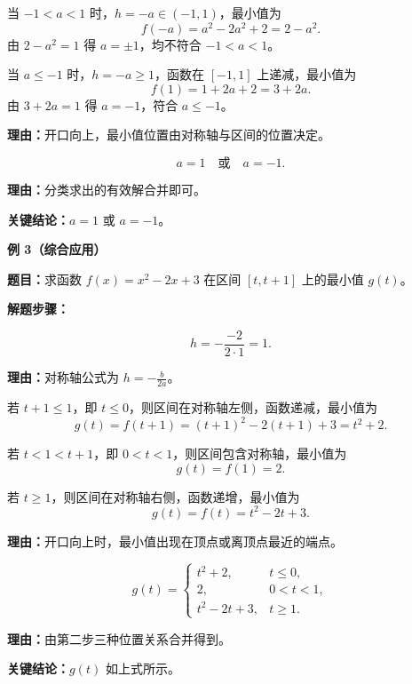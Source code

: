 \begin{examplebox}
\begin{description}[style=nextline, leftmargin=2.8em, labelsep=0.5em, itemsep=0.45em]
		      当 $-1<a<1$ 时，$h=-a\in(-1,1)$，最小值为
		      \[
			      f(-a)=a^2-2a^2+2=2-a^2.
		      \]
		      由 $2-a^2=1$ 得 $a=\pm1$，均不符合 $-1<a<1$。

		      当 $a\le-1$ 时，$h=-a\ge1$，函数在 $[-1,1]$ 上递减，最小值为
		      \[
			      f(1)=1+2a+2=3+2a.
		      \]
		      由 $3+2a=1$ 得 $a=-1$，符合 $a\le-1$。
		      \par\textbf{理由：}开口向上，最小值位置由对称轴与区间的位置决定。
		\item[\textbf{第三步（写出答案）：}]
		      \[
			      a=1\quad\text{或}\quad a=-1.
		      \]
		      \par\textbf{理由：}分类求出的有效解合并即可。
	\end{description}

	\textbf{\textcolor{CExample}{关键结论：}}$a=1$ 或 $a=-1$。

	\medskip
	\textbf{\textcolor{CExample}{例 3（综合应用）}}

	\textbf{\textcolor{CExample}{题目：}}求函数 $f(x)=x^2-2x+3$ 在区间 $[t,t+1]$ 上的最小值 $g(t)$。

	\textbf{\textcolor{CExample}{解题步骤：}}
	\begin{description}[style=nextline, leftmargin=2.8em, labelsep=0.5em, itemsep=0.45em]
		\item[\textbf{第一步（求对称轴）：}]
		      \[
			      h=-\frac{-2}{2\cdot1}=1.
		      \]
		      \par\textbf{理由：}对称轴公式为 $h=-\frac{b}{2a}$。
		\item[\textbf{第二步（分情况求最小值）：}]
		      若 $t+1\le1$，即 $t\le0$，则区间在对称轴左侧，函数递减，最小值为
		      \[
			      g(t)=f(t+1)=(t+1)^2-2(t+1)+3=t^2+2.
		      \]

		      若 $t<1<t+1$，即 $0<t<1$，则区间包含对称轴，最小值为
		      \[
			      g(t)=f(1)=2.
		      \]

		      若 $t\ge1$，则区间在对称轴右侧，函数递增，最小值为
		      \[
			      g(t)=f(t)=t^2-2t+3.
		      \]
		      \par\textbf{理由：}开口向上时，最小值出现在顶点或离顶点最近的端点。
		\item[\textbf{第三步（得出分段表达式）：}]
		      \[
			      g(t)=\begin{cases}
				      t^2+2,    & t\le0, \\[2pt]
				      2,        & 0<t<1, \\[2pt]
				      t^2-2t+3, & t\ge1.
			      \end{cases}
		      \]
		      \par\textbf{理由：}由第二步三种位置关系合并得到。
	\end{description}

	\textbf{\textcolor{CExample}{关键结论：}}$g(t)$ 如上式所示。
\end{examplebox}